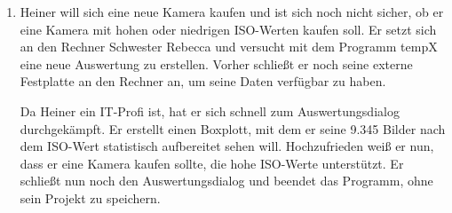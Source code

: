 \begin{enumerate}
	\item Heiner will sich eine neue Kamera kaufen und ist sich noch nicht sicher, ob er eine Kamera mit hohen oder niedrigen ISO-Werten kaufen soll. Er setzt sich an den Rechner Schwester Rebecca und versucht mit dem Programm \gls{tempX} eine neue Auswertung zu erstellen. Vorher schließt er noch seine externe Festplatte an den Rechner an, um seine Daten verfügbar zu haben.\par
	Da Heiner ein IT-Profi ist, hat er sich schnell zum Auswertungsdialog durchgekämpft. Er erstellt einen Boxplott, mit dem er seine 9.345 Bilder nach dem ISO-Wert statistisch aufbereitet sehen will. Hochzufrieden weiß er nun, dass er eine Kamera kaufen sollte, die hohe ISO-Werte unterstützt. Er schließt nun noch den Auswertungsdialog und beendet das Programm, ohne sein Projekt zu speichern.
 
\end{enumerate}
